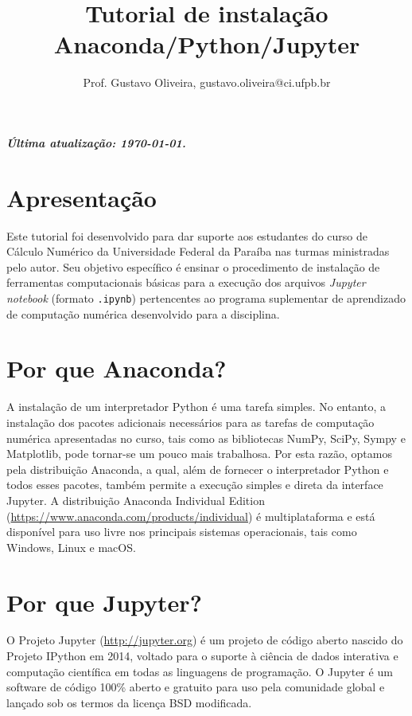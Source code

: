 \documentclass[a4paper,12pt]{article}
\title{Tutorial de instalação Anaconda/Python/Jupyter}
\author{Prof. Gustavo Oliveira, gustavo.oliveira@ci.ufpb.br}
\affil{Departamento de Computação Científica, CI/UFPB}
\date{}
\begin{document}
\maketitle



\subparagraph{\scriptsize{Última atualização: \today.}}

\section{Apresentação}

Este tutorial foi desenvolvido para dar suporte aos estudantes do curso
de Cálculo Numérico da Universidade Federal da Paraíba nas turmas ministradas pelo
autor. Seu objetivo específico é ensinar o procedimento de instalação de
ferramentas computacionais básicas para a execução dos arquivos
\emph{Jupyter notebook} (formato \texttt{.ipynb}) pertencentes ao
programa suplementar de aprendizado de computação numérica desenvolvido
para a disciplina.

\section*{Por que Anaconda?}

A instalação de um interpretador Python é uma tarefa simples. No
entanto, a instalação dos pacotes adicionais necessários para as tarefas
de computação numérica apresentadas no curso, tais como as bibliotecas
NumPy, SciPy, Sympy e Matplotlib, pode tornar-se um pouco mais
trabalhosa. Por esta razão, optamos pela distribuição Anaconda, a qual,
além de fornecer o interpretador Python e todos esses pacotes, também
permite a execução simples e direta da interface Jupyter. A distribuição
Anaconda Individual Edition (\url{https://www.anaconda.com/products/individual}) é multiplataforma e está disponível para uso livre nos principais sistemas operacionais, tais como Windows, Linux e macOS.

\section*{Por que Jupyter?}

O Projeto Jupyter (\url{http://jupyter.org}) é um projeto de código aberto nascido do Projeto
IPython em 2014, voltado para o suporte à ciência de dados interativa e
computação científica em todas as linguagens de programação. O Jupyter é
um software de código 100\% aberto e gratuito para uso pela comunidade
global e lançado sob os termos da licença BSD modificada.
\end{document}
